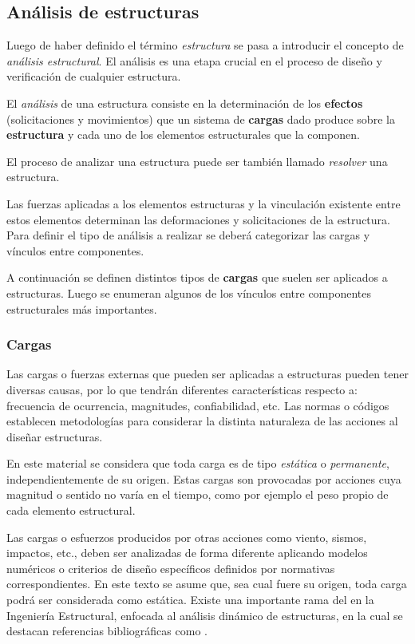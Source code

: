 \subsection{Análisis de estructuras}

Luego de haber definido el término \textit{estructura} se pasa a introducir el concepto de \textit{análisis estructural}. %
%
El análisis es una etapa crucial en el proceso de diseño y verificación de cualquier estructura.

{El \textit{análisis} de una estructura consiste en la determinación de los \textbf{efectos} (solicitaciones y movimientos) que un sistema de \textbf{cargas} dado produce sobre la \textbf{estructura} y cada uno de los elementos estructurales que la componen.}

El proceso de analizar una estructura puede ser también llamado \textit{resolver} una estructura. %

Las fuerzas aplicadas a los elementos estructuras y la vinculación existente entre estos elementos determinan las deformaciones y solicitaciones de la estructura. %
%
Para definir el tipo de análisis a realizar se deberá categorizar las cargas y vínculos entre componentes. %

A continuación se definen distintos tipos de \textbf{cargas} que suelen ser aplicados a estructuras. Luego se enumeran algunos de los vínculos entre componentes estructurales más importantes.

\subsubsection{Cargas}

Las cargas o fuerzas externas que pueden ser aplicadas a estructuras pueden tener diversas causas, por lo que tendrán diferentes características respecto a: frecuencia de ocurrencia, magnitudes, confiabilidad, etc. Las normas o códigos establecen metodologías para considerar la distinta naturaleza de las acciones al diseñar estructuras.

En este material se considera que toda carga es de tipo \textit{estática} o \textit{permanente}, independientemente de su origen. %
%
Estas cargas son provocadas por acciones cuya magnitud o sentido no varía en el tiempo, como por ejemplo el peso propio de cada elemento estructural. %

Las cargas o esfuerzos producidos por otras acciones como viento, sismos, impactos, etc., deben ser analizadas de forma diferente aplicando modelos numéricos o criterios de diseño específicos definidos por normativas correspondientes.
%
En este texto se asume que, sea cual fuere su origen, toda carga podrá ser considerada como estática. %
%
Existe una importante rama del en la Ingeniería Estructural, enfocada al análisis dinámico de estructuras, en la cual se destacan referencias bibliográficas como \citep{clough1993dynamics}.
%


